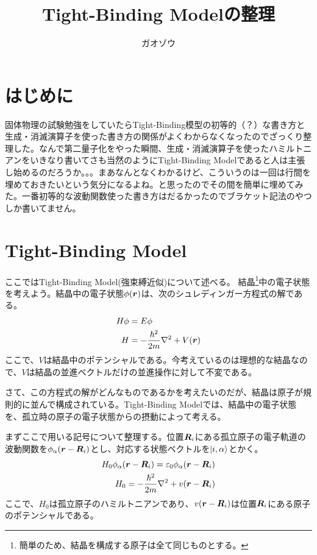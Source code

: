 \documentclass[uplatex,dvipdfmx]{jsarticle}
\title{Tight-Binding Modelの整理}
\author{ガオゾウ}
\begin{document}
\maketitle

\section{はじめに}
    固体物理の試験勉強をしていたらTight-Binding模型の初等的（？）な書き方と生成・消滅演算子を使った書き方の関係がよくわからなくなったのでざっくり整理した。なんで第二量子化をやった瞬間、生成・消滅演算子を使ったハミルトニアンをいきなり書いてさも当然のようにTight-Binding Modelであると人は主張し始めるのだろうか。。。まあなんとなくわかるけど、こういうのは一回は行間を埋めておきたいという気分になるよね。と思ったのでその間を簡単に埋めてみた。一番初等的な波動関数使った書き方はだるかったのでブラケット記法のやつしか書いてません。

\section{Tight-Binding Model}
    ここではTight-Binding Model(強束縛近似)について述べる。
    結晶\footnote{簡単のため、結晶を構成する原子は全て同じものとする。}中の電子状態を考えよう。結晶中の電子状態$\phi(\vb*{r})$は、次のシュレディンガー方程式の解である。
    \begin{align}
        H\phi &= E\phi \\
        H &= -\frac{\hbar^2}{2m}\nabla^2 + V(\vb*{r})
    \end{align}
    ここで、$V$は結晶中のポテンシャルである。今考えているのは理想的な結晶なので、$V$は結晶の並進ベクトルだけの並進操作に対して不変である。

    さて、この方程式の解がどんなものであるかを考えたいのだが、結晶は原子が規則的に並んで構成されている。Tight-Binding Modelでは、結晶中の電子状態を、孤立時の原子の電子状態からの摂動によって考える。

    まずここで用いる記号について整理する。位置$\vb*{R}_i$にある孤立原子の電子軌道の波動関数を$\phi_\alpha(\vb*{r}-\vb*{R}_i)$とし、対応する状態ベクトルを$\ket{i,\alpha}$とかく。
    \begin{align}
        H_0 \phi_\alpha(\vb*{r}-\vb*{R}_i) = \varepsilon_0 \phi_\alpha(\vb*{r}-\vb*{R}_i) \\
        H_0 = -\frac{\hbar^2}{2m}\nabla^2 + v(\vb*{r}-\vb*{R}_i)
    \end{align}
    ここで、$H_0$は孤立原子のハミルトニアンであり、$v(\vb*{r}-\vb*{R}_i)$は位置$\vb*{R}_i$にある原子のポテンシャルである。
    \vspace{0.5cm}
\end{document}
